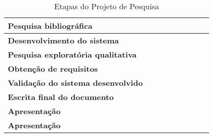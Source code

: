 \begin{table}[H]
{\begin{tabular}{@{}l|l|l|l|l|l|l|l|l|@{}}
      \multicolumn{1}{|l|}{\textbf{Pesquisa bibliográfica}}            & \cellcolor[HTML]{A4C2F4} & \cellcolor[HTML]{A4C2F4} & \cellcolor[HTML]{A4C2F4} &                          &                          &                          &                          &                          \\ \midrule
      \multicolumn{1}{|l|}{\textbf{Desenvolvimento do sistema}}        & \cellcolor[HTML]{A4C2F4} & \cellcolor[HTML]{A4C2F4} & \cellcolor[HTML]{A4C2F4} & \cellcolor[HTML]{A4C2F4} & \cellcolor[HTML]{A4C2F4} & \cellcolor[HTML]{A4C2F4} & \cellcolor[HTML]{A4C2F4} &                          \\ \midrule
      \multicolumn{1}{|l|}{\textbf{Pesquisa exploratória qualitativa}} &                          & \cellcolor[HTML]{A4C2F4} & \cellcolor[HTML]{A4C2F4} & \cellcolor[HTML]{A4C2F4} &                          &                          &                          &                          \\ \midrule
      \multicolumn{1}{|l|}{\textbf{Obtenção de requisitos}}            &                          & \cellcolor[HTML]{A4C2F4} & \cellcolor[HTML]{A4C2F4} & \cellcolor[HTML]{A4C2F4} &                          &                          &                          &                          \\ \midrule
      \multicolumn{1}{|l|}{\textbf{Validação do sistema desenvolvido}} &                          &                          & \cellcolor[HTML]{A4C2F4} & \cellcolor[HTML]{A4C2F4} & \cellcolor[HTML]{A4C2F4} & \cellcolor[HTML]{A4C2F4} & \cellcolor[HTML]{A4C2F4} &                          \\ \midrule
      \multicolumn{1}{|l|}{\textbf{Escrita final do documento}}        &                          &                          &                          &                          &                          &                          & \cellcolor[HTML]{A4C2F4} & \cellcolor[HTML]{A4C2F4} \\ \midrule
      \multicolumn{1}{|l|}{\textbf{Apresentação}}                      &                          &                          &                          &                          &                          &                          &                          & \cellcolor[HTML]{A4C2F4} \\ \midrule
      \multicolumn{1}{|l|}{\textbf{Apresentação}}                      &                          &                          &                          &                          &                          &                          &                          & \cellcolor[HTML]{A4C2F4} \\ \bottomrule
    \end{tabular}%
  }
  \caption{Etapas do Projeto de Pesquisa}
  \label{tab:etapas}
\end{table}